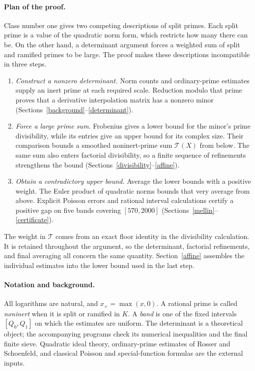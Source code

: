 \documentclass[11pt]{article}
\newcommand{\Tn}{\mathcal T}
\begin{document}
\paragraph{Plan of the proof.}
Class number one gives two competing descriptions of split primes.
Each split prime is a value of the quadratic norm form, which restricts
how many there can be. On the other hand, a determinant argument forces
a weighted sum of split and ramified primes to be large. The proof makes
these descriptions incompatible in three steps.
\begin{enumerate}
\item \emph{Construct a nonzero determinant.}
Norm counts and ordinary-prime estimates supply an inert prime at each
required scale. Reduction modulo that prime proves that a derivative
interpolation matrix has a nonzero minor
(Sections~\ref{background}--\ref{determinant}).
\item \emph{Force a large prime sum.}
Frobenius gives a lower bound for the minor's prime divisibility, while
its entries give an upper bound for its complex size. Their comparison
bounds a smoothed noninert-prime sum \(\Tn(X)\) from below.
The same sum also enters factorial divisibility, so a finite sequence
of refinements strengthens the bound
(Sections~\ref{divisibility}--\ref{affine}).
\item \emph{Obtain a contradictory upper bound.}
Average the lower bounds with a positive weight. The Euler product of
quadratic norms bounds that very average from above. Explicit Poisson
errors and rational interval calculations certify a positive gap on
five bands covering \([570,2000]\)
(Sections~\ref{mellin}--\ref{certificate}).
\end{enumerate}

The weight in \(\Tn\) comes from an exact floor identity in the
divisibility calculation. It is retained throughout the argument, so
the determinant, factorial refinements, and final averaging all concern
the same quantity. Section~\ref{affine} assembles the individual
estimates into the lower bound used in the last step.

\paragraph{Notation and background.}
All logarithms are natural, and \(x_+=\max(x,0)\).
A rational prime is called \emph{noninert} when it is split or ramified
in \(K\). A \emph{band} is one of the fixed intervals
\([Q_0,Q_1]\) on which the estimates are uniform. The determinant is
a theoretical object; the accompanying programs check its numerical
inequalities and the final finite sieve. Quadratic ideal theory,
ordinary-prime estimates of Rosser and Schoenfeld, and classical
Poisson and special-function formulas are the external inputs.
\end{document}
